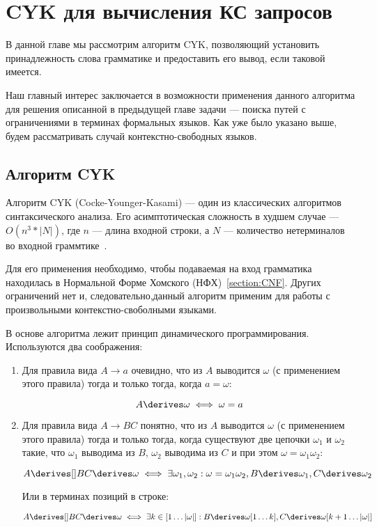\chapter{CYK для вычисления КС запросов}\label{chpt:CFPQ_CYK}

В данной главе мы рассмотрим алгоритм CYK, позволяющий установить принадлежность слова грамматике и предоставить его вывод, если таковой имеется.

Наш главный интерес заключается в возможности применения данного алгоритма для решения описанной в предыдущей главе задачи --- поиска путей с ограничениями в терминах формальных языков. Как уже было указано выше, будем рассматривать случай контекстно-свободных языков.

\section{Алгоритм CYK}\label{sect:lin_CYK}

Алгоритм CYK (Cocke-Younger-Kasami) --- один из классических алгоритмов синтаксического анализа. Его асимптотическая сложность в худшем случае --- $O(n^3 * |N|)$, где $n$ --- длина входной строки, а $N$ --- количество нетерминалов во входной граммтике~\cite{Hopcroft+Ullman/79/Introduction}. 

Для его применения необходимо, чтобы подаваемая на вход грамматика находилась в Нормальной Форме Хомского (НФХ)~\ref{section:CNF}. Других ограничений нет и, следовательно,данный алгоритм применим для работы с произвольными контекстно-своболными языками.

В основе алгоритма лежит принцип динамического программирования. Используются два соображения:

\begin{enumerate}
\item Для правила вида $A \to a$ очевидно, что из $A$ выводится $\omega$ (с применением этого правила) тогда и только тогда, когда $a = \omega$:

\[
  A \derives \omega \iff \omega = a
\]

\item Для правила вида $A \to B C$ понятно, что из $A$ выводится $\omega$ (с применением этого правила) тогда и только тогда, когда существуют две цепочки $\omega_1$ и $\omega_2$ такие, что $\omega_1$ выводима из $B$, $\omega_2$ выводима из $C$ и при этом $\omega = \omega_1 \omega_2$:

\[
A \derives[] B C \derives \omega \iff \exists \omega_1, \omega_2 : \omega = \omega_1 \omega_2, B \derives \omega_1, C \derives \omega_2
\]

Или в терминах позиций в строке:

\[
A \derives[] B C \derives \omega \iff \exists k \in [1 \dots |\omega|] : B \derives \omega[1 \dots k], C \derives \omega[k+1 \dots |\omega|]
\]
\end{enumerate}

